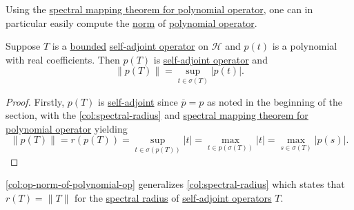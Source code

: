 Using the \hyperref[thm:spectral-mapping-for-polynomial-op]{spectral mapping theorem for polynomial operator}, one can in particular easily compute the \hyperref[def:norm]{norm} of \hyperref[def:polynomial-op]{polynomial operator}.

\begin{corollary}\label{col:op-norm-of-polynomial-op}
	Suppose \(T\) is a \hyperref[rmk:bounded-op]{bounded} \hyperref[def:self-adjoint-op]{self-adjoint operator} on \(\mathcal{H} \) and \(p(t)\) is a polynomial with real coefficients. Then \(p(T)\) is \hyperref[def:self-adjoint-op]{self-adjoint operator} and
	\[
		\lVert p(T) \rVert = \sup _{t\in \sigma (T)}\vert p(t) \vert.
	\]
\end{corollary}
\begin{proof}
	Firstly, \(p(T)\) is \hyperref[def:self-adjoint-op]{self-adjoint} since \(\overline{p} = p\) as noted in the beginning of the section, with the \autoref{col:spectral-radius} and \hyperref[thm:spectral-mapping-for-polynomial-op]{spectral mapping theorem for polynomial operator} yielding
	\[
		\lVert p(T) \rVert = r(p(T)) = \sup _{t\in \sigma (p(T))} \vert t \vert = \max _{t\in p(\sigma (T))} \vert t \vert = \max _{s\in \sigma (T)} \vert p(s) \vert .
	\]
\end{proof}

\autoref{col:op-norm-of-polynomial-op} generalizes \autoref{col:spectral-radius} which states that \(r(T) = \lVert T \rVert \) for the \hyperref[def:spectral-radius]{spectral radius} of \hyperref[def:self-adjoint-op]{self-adjoint operators} \(T\).